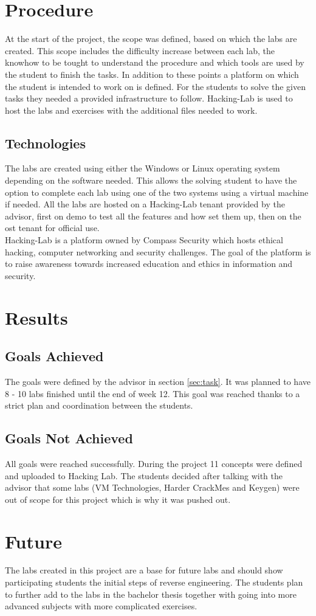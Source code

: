 \section{Procedure}
At the start of the project, the scope was defined, based on which the labs are created. This scope includes the difficulty increase between each lab, the knowhow to be tought to understand the procedure and which tools are used by the student to finish the tasks. In addition to these points a platform on which the student is intended to work on is defined.
For the students to solve the given tasks they needed a provided infrastructure to follow. Hacking-Lab is used to host the labs and exercises with the additional files needed to work.

\subsection{Technologies}
The labs are created using either the Windows or Linux operating system depending on the software needed. This allows the solving student to have the option to complete each lab using one of the two systems using a virtual machine if needed. 
All the labs are hosted on a Hacking-Lab tenant provided by the advisor, first on demo to test all the features and how set them up, then on the ost tenant for official use. \\
Hacking-Lab is a platform owned by Compass Security which hosts ethical hacking, computer networking and security challenges. The goal of the platform is to raise awareness towards increased education and ethics in information and security. 

\section{Results}
\subsection{Goals Achieved}
The goals were defined by the advisor in section \ref{sec:task}. It was planned to have 8 - 10 labs finished until the end of week 12. This goal was reached thanks to a strict plan and coordination between the students.

\subsection{Goals Not Achieved}
All goals were reached successfully. During the project 11 concepts were defined and uploaded to Hacking Lab. The students decided after talking with the advisor that some labs (VM Technologies, Harder CrackMes and Keygen) were out of scope for this project which is why it was pushed out. 

\section{Future}
The labs created in this project are a base for future labs and should show participating students the initial steps of reverse engineering. The students plan to further add to the labs in the bachelor thesis together with going into more advanced subjects with more complicated exercises. 
